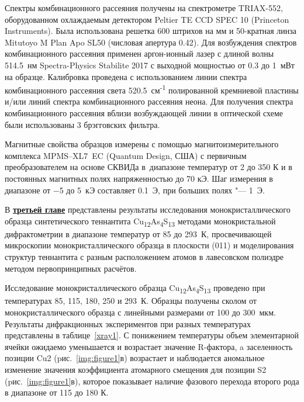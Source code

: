 Спектры комбинационного рассеяния получены на спектрометре TRIAX-552, оборудованном охлаждаемым детектором Peltier TE CCD SPEC 10 (Princeton Instruments).
Была использована решетка 600 штрихов на мм и 50-кратная линза Mitutoyo M Plan Apo SL50 (числовая апертура 0.42).
Для возбуждения спектров комбинационного рассеяния применен аргон-ионный лазер с длиной волны 514.5~нм Spectra-Physics Stabilite 2017 с выходной мощностью от 0.3 до 1~мВт на образце. Калибровка проведена с использованием линии спектра комбинационного рассеяния света 520.5~см\textsuperscript{-1} полированной кремниевой пластины и/или линий спектра комбинационного рассеяния неона.
Для получения спектра комбинационного рассеяния вблизи возбуждающей линии в оптической схеме были использованы 3  брэгговских фильтра.

Магнитные свойства образцов измерены с
помощью магнитоизмерительного комплекса
MPMS--XL7~EC (Quantum Design, США) с первичным преобразователем на основе СКВИДа в~диапазоне температур от 2 до 350 К и в постоянных магнитных полях напряженностью до 70 кЭ. Шаг измерения в диапазоне от $-$5 до 5~кЭ составляет 0.1~Э, при больших полях "--- 1~Э.

В \underline{\textbf{третьей главе}} представлены результаты исследования монокристаллического образца синтетического теннантита Cu\textsubscript{12}As\textsubscript{4}S\textsubscript{13} методами монокристальной дифрактометрии в диапазоне температур от 85 до 293~К, просвечивающей микроскопии монокристаллического образца в плоскости (011) и моделирования структур теннантита с разным расположением атомов в лавесовском полиэдре методом первопринципных расчётов.



Исследование монокристаллического образца  Cu\textsubscript{12}As\textsubscript{4}S\textsubscript{13} проведено при температурах 85, 115, 180, 250 и 293~К. Образцы получены сколом от монокристаллического образца с линейными размерами от 100 до 300~мкм.  Результаты дифракционных экспериментов при разных температурах представлены в таблице~\ref{xray1}. С понижением температуры объем элементарной ячейки ожидаемо уменьшается и возрастает значение R-фактора, a  заселенность позиции Cu2 (pис.~\ref{img:figure1}в) возрастает и  наблюдается аномальное изменение значения коэффициента атомарного смещения для позиции S2 (pис.~\ref{img:figure1}в), которое показывает наличие фазового перехода второго рода в диапазоне от 115 до 180 К.



